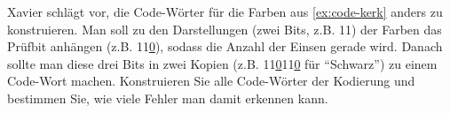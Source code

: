 \begin{myexercise}\label{ex:xavier}
    Xavier schlägt vor, die Code-Wörter für die Farben aus \cref{ex:code-kerk} anders zu konstruieren. Man soll zu den Darstellungen (zwei Bits, z.B. 11) der Farben das Prüfbit anhängen (z.B. 11\underline{0}), sodass die Anzahl der Einsen gerade wird. Danach sollte man diese drei Bits in zwei Kopien (z.B. 11\underline{0}11\underline{0} für \enquote{Schwarz}) zu einem Code-Wort machen. Konstruieren Sie alle Code-Wörter der Kodierung und bestimmen Sie, wie viele Fehler man damit erkennen kann.
\end{myexercise}
